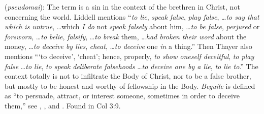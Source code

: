 \item[Beguile,]

(\textit{pseudomai}):
The term is a sin in the context of the brethren in Christ, not concerning the world. Liddell mentions ``\emph{to lie}, \emph{speak false}, \emph{play false}, \ldots \emph{to say that which is untrue}, \ldots which \emph{I do} not \emph{speak falsely} about him, \ldots \emph{to be false}, \emph{perjured} or \emph{forsworn}, \ldots \emph{to belie}, \emph{falsify}, \ldots \emph{to break} them, \ldots \emph{had broken their word} about the money, \ldots \emph{to deceive by lies}, \emph{cheat}, \ldots \emph{to deceive} one \emph{in} a thing.'' Then Thayer also mentions ```to deceive', `cheat'; hence, properly, \emph{to show oneself deceitful}, \emph{to play false} \ldots \emph{to lie}, \emph{to speak deliberate falsehoods} \ldots \emph{to deceive one by a lie}, \emph{to lie to}.'' The context totally is not to infiltrate the Body of Christ, nor to be a false brother, but mostly to be honest and worthy of fellowship in the Body. \emph{Beguile} is defined as ``to persuade, attract, or interest someone, sometimes in order to deceive them,'' see , , and .
Found in Col 3:9.
